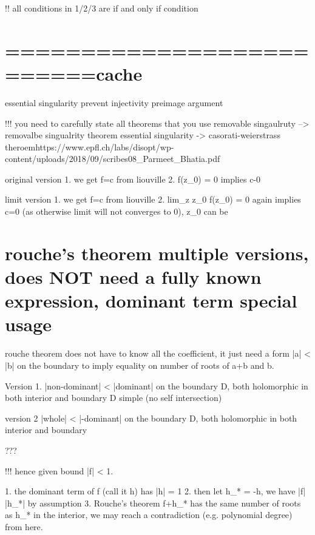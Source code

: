 {{    !! all conditions in 1/2/3 are if and only if condition	 



\section*{==========================cache}

essential singularity prevent injectivity
	preimage argument

!!! you need to carefully state all theorems that you use
removable singaulruty --> removalbe singualrity theorem
essential singularity -> casorati-weierstrass theroemhttps://www.epfl.ch/labs/disopt/wp-content/uploads/2018/09/scribes08_Parmeet_Bhatia.pdf

original version
	1. we get f=c from liouville
	2. f(z_0) = 0 implies c-0
	
limit version
	1. we get f=c from liouville
	2. lim_{z \to z_0} f(z_0) = 0 again implies c=0 (as otherwise limit will not converges to 0), z_0 can be \infty










\section*{rouche's theorem multiple versions, does NOT need a fully known expression, dominant term special usage}
rouche theorem does not have to know all the coefficient, it just need a form |a| < |b| on the boundary to imply equality on number of roots of a+b and b. 



Version 1.
    |non-dominant| < |dominant| on the boundary \partial D, both holomorphic in both interior and boundary
    \partial D simple (no self intersection)
    
version 2
    |whole| < |-dominant| on the boundary \partial D, both holomorphic in both interior and boundary 

???



!!! hence given bound |f| < 1. 



    1. the dominant term of f (call it h) has |h| = 1
    2. then let h_* = -h, we have |f| \leq |h_*| by assumption
    3. Rouche's theorem f+h_* has the same number of roots as h_* in the interior, we may reach a contradiction (e.g. polynomial degree) from here.


}}
